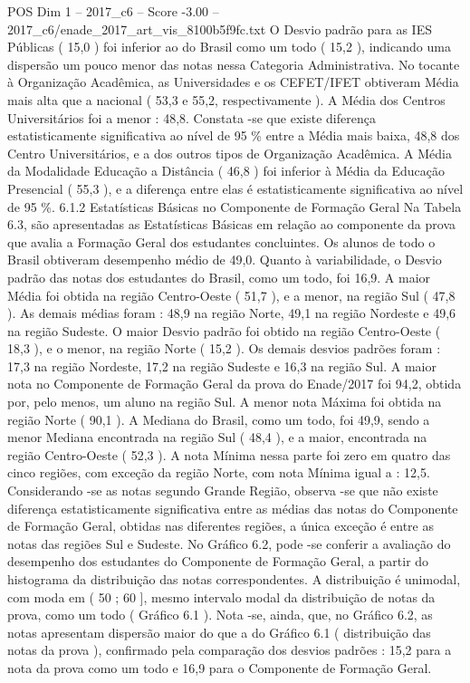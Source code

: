 \begin{textsample}{POS Dim 1 – 2017\_c6 – Score -3.00 – 2017\_c6/enade\_2017\_art\_vis\_8100b5f9fc.txt}
O Desvio padrão para as IES Públicas ( 15,0 ) foi inferior ao do Brasil como um todo ( 15,2 ), indicando uma dispersão um pouco menor das notas nessa Categoria Administrativa.
No tocante à Organização Acadêmica, as Universidades e os CEFET/IFET obtiveram Média mais alta que a nacional ( 53,3 e 55,2, respectivamente ).
A Média dos Centros Universitários foi a menor : 48,8.
Constata -se que existe diferença estatisticamente significativa ao nível de 95 \% entre a Média mais baixa, 48,8 dos Centro Universitários, e a dos outros tipos de Organização Acadêmica.
A Média da Modalidade Educação a Distância ( 46,8 ) foi inferior à Média da Educação Presencial ( 55,3 ), e a diferença entre elas é estatisticamente significativa ao nível de 95 \%. 6.1.2 Estatísticas Básicas no Componente de Formação Geral Na Tabela 6.3, são apresentadas as Estatísticas Básicas em relação ao componente da prova que avalia a Formação Geral dos estudantes concluintes.
Os alunos de todo o Brasil obtiveram desempenho médio de 49,0.
Quanto à variabilidade, o Desvio padrão das notas dos estudantes do Brasil, como um todo, foi 16,9.
A maior Média foi obtida na região Centro-Oeste ( 51,7 ), e a menor, na região Sul ( 47,8 ).
As demais médias foram : 48,9 na região Norte, 49,1 na região Nordeste e 49,6 na região Sudeste.
O maior Desvio padrão foi obtido na região Centro-Oeste ( 18,3 ), e o menor, na região Norte ( 15,2 ).
Os demais desvios padrões foram : 17,3 na região Nordeste, 17,2 na região Sudeste e 16,3 na região Sul.
A maior nota no Componente de Formação Geral da prova do Enade/2017 foi 94,2, obtida por, pelo menos, um aluno na região Sul.
A menor nota Máxima foi obtida na região Norte ( 90,1 ).
A Mediana do Brasil, como um todo, foi 49,9, sendo a menor Mediana encontrada na região Sul ( 48,4 ), e a maior, encontrada na região Centro-Oeste ( 52,3 ).
A nota Mínima nessa parte foi zero em quatro das cinco regiões, com exceção da região Norte, com nota Mínima igual a : 12,5.
Considerando -se as notas segundo Grande Região, observa -se que não existe diferença estatisticamente significativa entre as médias das notas do Componente de Formação Geral, obtidas nas diferentes regiões, a única exceção é entre as notas das regiões Sul e Sudeste.
No Gráfico 6.2, pode -se conferir a avaliação do desempenho dos estudantes do Componente de Formação Geral, a partir do histograma da distribuição das notas correspondentes.
A distribuição é unimodal, com moda em ( 50 ; 60 ], mesmo intervalo modal da distribuição de notas da prova, como um todo ( Gráfico 6.1 ).
Nota -se, ainda, que, no Gráfico 6.2, as notas apresentam dispersão maior do que a do Gráfico 6.1 ( distribuição das notas da prova ), confirmado pela comparação dos desvios padrões : 15,2 para a nota da prova como um todo e 16,9 para o Componente de Formação Geral.

\end{textsample}

